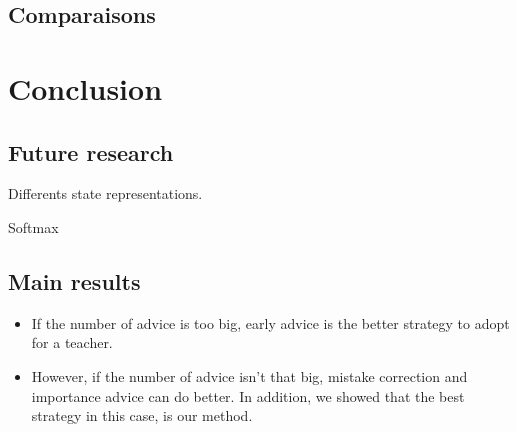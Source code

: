 \documentclass[a4paper,12pt]{article}
\begin{document}
%       
%       
%      
      
      \subsection{Comparaisons}
      
      
      \section{Conclusion}
      
      \subsection{Future research}
      
      Differents state representations.
      
      Softmax
      
      \subsection{Main results}
      
      \begin{itemize}
       
      

      \item If the number of advice is too big, early advice is the better strategy to adopt for a teacher.
      
      \item However, if the number of advice isn't that big, mistake correction and importance advice can
      do better. In addition, we showed that the best strategy in this case, is our method.
      
      \end{itemize}
%        
\end{document}
